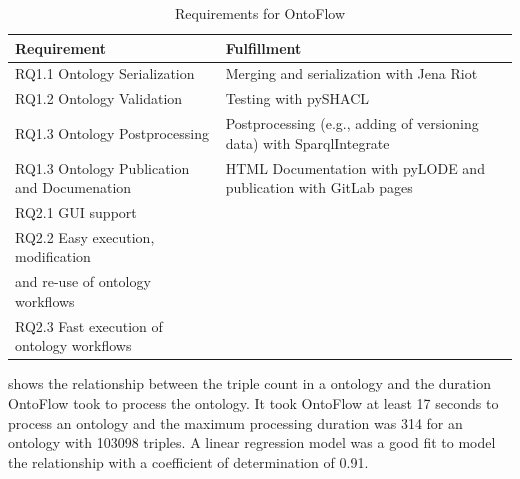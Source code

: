 \documentclass[sigconf]{acmart}
\begin{document}
\begin{table}[htb]
\begin{tabular}{@{}ll@{}}
\toprule
Requirement &
Fulfillment \\ \midrule
  RQ1.1 Ontology Serialization & Merging and serialization with Jena Riot\\
  RQ1.2 Ontology Validation & Testing with pySHACL\\
  RQ1.3 Ontology Postprocessing & Postprocessing (e.g., adding of versioning data) with SparqlIntegrate\\
  RQ1.3 Ontology Publication and Documenation & HTML Documentation with pyLODE and publication with GitLab pages\\
  RQ2.1 GUI support & \\
  RQ2.2 Easy execution, modification\\ and re-use of ontology workflows & \\
  RQ2.3 Fast execution of ontology workflows & 
\end{tabular}
\caption{Requirements for OntoFlow}
\label{tab:eval}
\end{table}


 shows the relationship between the triple count in a ontology and the duration OntoFlow took to process the ontology.
It took OntoFlow at least 17 seconds to process an ontology and the maximum processing duration was 314 for an ontology with 103098 triples.
A linear regression model was a good fit to model the relationship with a coefficient of determination of 0.91.
\end{document}
